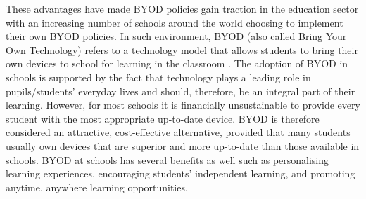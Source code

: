 \documentclass[a4paper,10pt,twocolumn,preprint,3p]{elsarticle}
\begin{document}
These advantages have made BYOD policies gain traction in the education
sector with an increasing number of schools around the world choosing
to implement their own BYOD policies. %
In such environment, BYOD (also
called Bring Your Own Technology) refers to a technology model that
allows students to bring their own devices to school for learning in
the classroom \cite{sangani2013byod, song2014bring}. The adoption of BYOD in schools
is supported by the fact that technology plays a leading role in
pupils/students' everyday lives and should, therefore, be an integral
part of their learning. However, for most schools it is financially
unsustainable to provide every student with the most appropriate
up-to-date device. BYOD is therefore considered an attractive,
cost-effective alternative, provided that many students usually own
devices that are superior and more up-to-date than those available in
schools. BYOD at schools has several benefits as well such as
personalising learning experiences, encouraging students' independent
learning, and promoting anytime, anywhere learning opportunities. %
\end{document}
